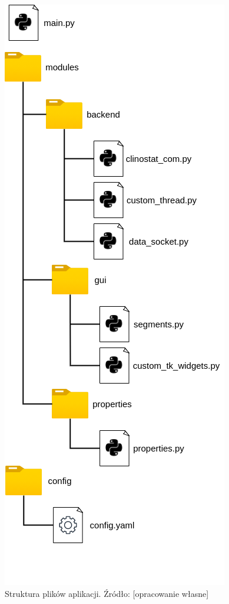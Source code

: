 \begin{figure}[h]
	
	\centering
	\includegraphics[scale=.34]{tree}
	\caption{Struktura plików aplikacji. Źródło: [opracowanie własne]} 
	\label{fig:drzewo}
	
\end{figure}

